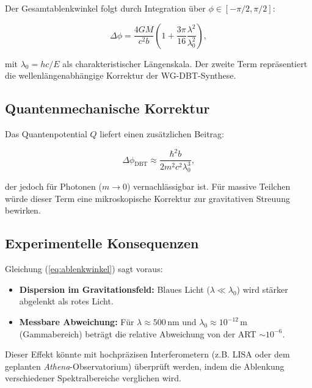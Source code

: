 Der Gesamtablenkwinkel folgt durch Integration über $\phi \in [-\pi/2, \pi/2]$:

\begin{equation}
\Delta \phi = \frac{4GM}{c^2 b} \left(1 + \frac{3\pi}{16} \frac{\lambda^2}{\lambda_0^2}\right),
\label{eq:ablenkwinkel}
\end{equation}

mit $\lambda_0 = hc/E$ als charakteristischer Längenskala. Der zweite Term repräsentiert die wellenlängenabhängige Korrektur der WG-DBT-Synthese.

\subsection{Quantenmechanische Korrektur}
Das Quantenpotential $Q$ liefert einen zusätzlichen Beitrag:

\begin{equation}
\Delta \phi_{\text{DBT}} \approx \frac{\hbar^2 b}{2m^2 c^2 \lambda_0^3},
\end{equation}

der jedoch für Photonen ($m \to 0$) vernachlässigbar ist. Für massive Teilchen würde dieser Term eine mikroskopische Korrektur zur gravitativen Streuung bewirken.

\subsection{Experimentelle Konsequenzen}
Gleichung (\ref{eq:ablenkwinkel}) sagt voraus:
\begin{itemize}
\item \textbf{Dispersion im Gravitationsfeld:} Blaues Licht ($\lambda \ll \lambda_0$) wird stärker abgelenkt als rotes Licht.
\item \textbf{Messbare Abweichung:} Für $\lambda \approx 500\,\text{nm}$ und $\lambda_0 \approx 10^{-12}\,\text{m}$ (Gammabereich) beträgt die relative Abweichung von der ART $\sim 10^{-6}$.
\end{itemize}

Dieser Effekt könnte mit hochpräzisen Interferometern (z.B. LISA oder dem geplanten \textit{Athena}-Observatorium) überprüft werden, indem die Ablenkung verschiedener
Spektralbereiche verglichen wird.
